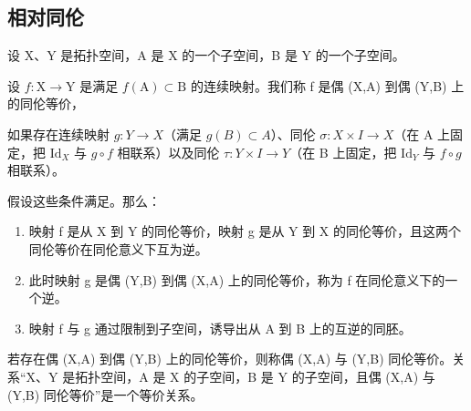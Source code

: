\subsection{相对同伦}

设 X、Y 是拓扑空间，A 是 X 的一个子空间，B 是 Y 的一个子空间。

设 \(f:\mathrm{X}\to\mathrm{Y}\) 是满足 \(f(\mathrm{A})\subset\mathrm{B}\) 的连续映射。我们称 f 是偶 (X,A) 到偶 (Y,B) 上的同伦等价，

如果存在连续映射 \(g\colon Y\to X\)（满足 \(g(B)\subset A\)）、同伦 \(\sigma\colon X\times I\to X\)（在 A 上固定，把 \(\text{Id}_X\) 与 \(g\circ f\) 相联系）以及同伦 \(\tau\colon Y\times I\to Y\)（在 B 上固定，把 \(\text{Id}_Y\) 与 \(f\circ g\) 相联系）。

假设这些条件满足。那么：

\begin{enumerate}
\def\labelenumi{\alph{enumi})}
\item
  映射 f 是从 X 到 Y 的同伦等价，映射 g 是从 Y 到 X 的同伦等价，且这两个同伦等价在同伦意义下互为逆。
\item
  此时映射 g 是偶 (Y,B) 到偶 (X,A) 上的同伦等价，称为 f 在同伦意义下的一个逆。
\item
  映射 f 与 g 通过限制到子空间，诱导出从 A 到 B 上的互逆的同胚。
\end{enumerate}

若存在偶 (X,A) 到偶 (Y,B) 上的同伦等价，则称偶 (X,A) 与 (Y,B) 同伦等价。关系“X、Y 是拓扑空间，A 是 X 的子空间，B 是 Y 的子空间，且偶 (X,A) 与 (Y,B) 同伦等价”是一个等价关系。

